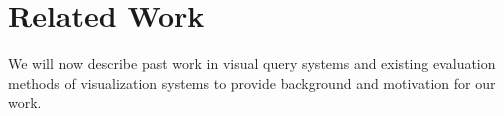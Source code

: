   \section{Related Work\label{sec:relatedworks}}
  \npar We will now describe past work in visual query systems and existing evaluation methods of visualization systems to provide background and motivation for our work. 
  \par {}
